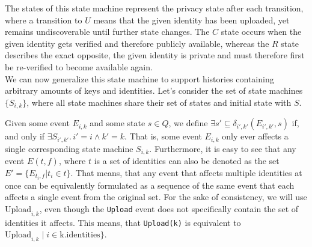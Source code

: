 The states of this state machine represent the privacy state after each transition, where a transition to \(U\) means that the given identity has been uploaded, yet remains undiscoverable until further state changes. The \(C\) state occurs when the given identity gets verified and therefore publicly available, whereas the \(R\) state describes the exact opposite, the given identity is private and must therefore first be re-verified to become available again.
\\

We can now generalize this state machine to support histories containing arbitrary amounts of keys and identities. Let's consider the set of state machines \(\{S_{i,k}\}\), where all state machines share their set of states and initial state with \(S\). 

Given some event \(E_{i,k}\) and some state \(s \in Q\), we define \( \exists {s'} \subseteq \delta_{i',k'}(E_{i',k'},s) \) if, and only if \( \exists S_{i',k'} .\, i' = i \wedge k' = k\). That is, some event \(E_{i,k}\) only ever affects a single corresponding state machine \(S_{i,k}\).
Furthermore, it is easy to see that any event \(E(t,f)\), where \(t\) is a set of identities can also be denoted as the set \(E' = \{E_{t_i,f} | t_i \in t\} \). That means, that any event that affects multiple identities at once can be equivalently formulated as a sequence of the same event that each affects a single event from the original set.
For the sake of consistency, we will use \(\text{Upload}_{i,k}\), even though the \texttt{Upload} event does not specifically contain the set of identities it affects. This means, that \texttt{Upload(k)} is equivalent to \(\text{Upload}_{i,k} \; \big|\; i \in \text{k.identities}\}\).

